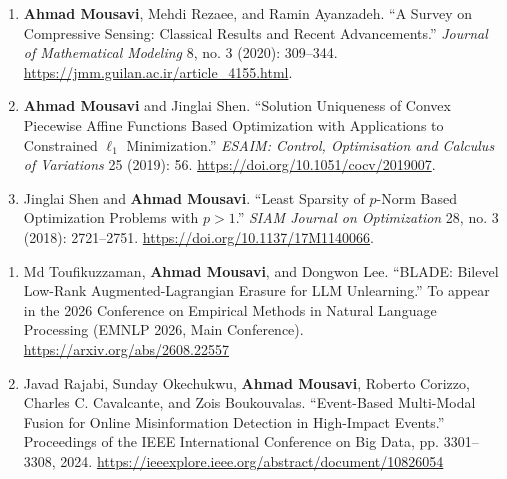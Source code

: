 \documentclass[letterpaper,11pt]{article}
\newcommand{\resheading}[1]{\par\vspace{0.6em}\noindent{\large\textbf{#1}}\par\vspace{0.25em}}
\begin{document}
\begin{enumerate}
\item[3.] \textbf{Ahmad Mousavi}, Mehdi Rezaee, and Ramin Ayanzadeh. ``A Survey on Compressive Sensing: Classical Results and Recent Advancements.'' \textit{Journal of Mathematical Modeling} 8, no. 3 (2020): 309--344. \url{https://jmm.guilan.ac.ir/article_4155.html}.

\item[2.] \textbf{Ahmad Mousavi} and Jinglai Shen. ``Solution Uniqueness of Convex Piecewise Affine Functions Based Optimization with Applications to Constrained $\ell_1$ Minimization.'' \textit{ESAIM: Control, Optimisation and Calculus of Variations} 25 (2019): 56. \url{https://doi.org/10.1051/cocv/2019007}.

\item[1.] Jinglai Shen and \textbf{Ahmad Mousavi}. ``Least Sparsity of $p$-Norm Based Optimization Problems with $p>1$.'' \textit{SIAM Journal on Optimization} 28, no. 3 (2018): 2721--2751. \url{https://doi.org/10.1137/17M1140066}.
\end{enumerate}

\resheading{\large{Conference Papers}}
\begin{enumerate}
\item[2.] Md Toufikuzzaman, \textbf{Ahmad Mousavi}, and Dongwon Lee. ``BLADE: Bilevel Low-Rank Augmented-Lagrangian Erasure for LLM Unlearning.'' To appear in the 2026 Conference on Empirical Methods in Natural Language Processing (EMNLP 2026, Main Conference). \url{https://arxiv.org/abs/2608.22557}

\item[1.] Javad Rajabi, Sunday Okechukwu, \textbf{Ahmad Mousavi}, Roberto Corizzo, Charles C. Cavalcante, and Zois Boukouvalas. ``Event-Based Multi-Modal Fusion for Online Misinformation Detection in High-Impact Events.'' Proceedings of the IEEE International Conference on Big Data, pp. 3301--3308, 2024. \url{https://ieeexplore.ieee.org/abstract/document/10826054}
\end{enumerate}
\end{document}
